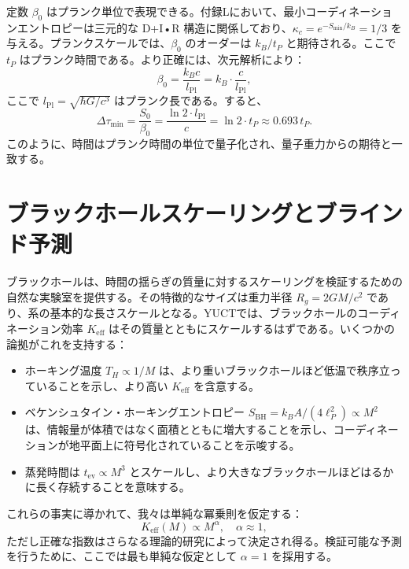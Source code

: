 \documentclass[12pt,a4paper]{article}
\newcommand{\Keff}{K_{\mathrm{eff}}}
\newcommand{\kappac}{\kappa_c}
\newcommand{\Lpl}{l_{\mathrm{Pl}}}
\begin{document}
	定数 \(\beta_0\) はプランク単位で表現できる。付録Lにおいて、最小コーディネーションエントロピーは三元的な D+I•R 構造に関係しており、\(\kappac = e^{-S_{\min}/k_B} = 1/3\) を与える。プランクスケールでは、\(\beta_0\) のオーダーは \(k_B / t_P\) と期待される。ここで \(t_P\) はプランク時間である。より正確には、次元解析により：
	\begin{equation}
		\beta_0 = \frac{k_B c}{\Lpl} = k_B \cdot \frac{c}{\Lpl},
	\end{equation}
	ここで \(\Lpl = \sqrt{\hbar G/c^3}\) はプランク長である。すると、
	\begin{equation}
		\Delta \tau_{\min} = \frac{S_0}{\beta_0} = \frac{\ln 2 \cdot \Lpl}{c} = \ln 2 \cdot t_P \approx 0.693 \, t_P.
	\end{equation}
	このように、時間はプランク時間の単位で量子化され、量子重力からの期待と一致する。
	
	\section{ブラックホールスケーリングとブラインド予測}
	\label{sec:blackhole}
	
	ブラックホールは、時間の揺らぎの質量に対するスケーリングを検証するための自然な実験室を提供する。その特徴的なサイズは重力半径 \(R_g = 2GM/c^2\) であり、系の基本的な長さスケールとなる。YUCTでは、ブラックホールのコーディネーション効率 \(\Keff\) はその質量とともにスケールするはずである。いくつかの論拠がこれを支持する：
	\begin{itemize}
		\item ホーキング温度 \(T_H \propto 1/M\) は、より重いブラックホールほど低温で秩序立っていることを示し、より高い \(\Keff\) を含意する。
		\item ベケンシュタイン・ホーキングエントロピー \(S_{\text{BH}} = k_B A/(4\ell_P^2) \propto M^2\) は、情報量が体積ではなく面積とともに増大することを示し、コーディネーションが地平面上に符号化されていることを示唆する。
		\item 蒸発時間は \(t_{\text{ev}} \propto M^3\) とスケールし、より大きなブラックホールほどはるかに長く存続することを意味する。
	\end{itemize}
	これらの事実に導かれて、我々は単純な冪乗則を仮定する：
	\begin{equation}
		\Keff(M) \propto M^{\alpha}, \quad \alpha \approx 1,
	\end{equation}
	ただし正確な指数はさらなる理論的研究によって決定され得る。検証可能な予測を行うために、ここでは最も単純な仮定として \(\alpha = 1\) を採用する。
	
\end{document}
